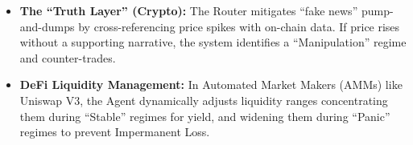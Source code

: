 \documentclass[12pt, a4paper]{report}
\begin{document}
\begin{itemize}
    \item \textbf{The ``Truth Layer'' (Crypto):} The Router mitigates ``fake news'' pump-and-dumps by cross-referencing price spikes with on-chain data. If price rises without a supporting narrative, the system identifies a ``Manipulation'' regime and counter-trades.
    \item \textbf{DeFi Liquidity Management:} In Automated Market Makers (AMMs) like Uniswap V3, the Agent dynamically adjusts liquidity ranges concentrating them during ``Stable'' regimes for yield, and widening them during ``Panic'' regimes to prevent Impermanent Loss.
\end{itemize}
\newpage
\renewcommand{\bibname}{References}
\end{document}
